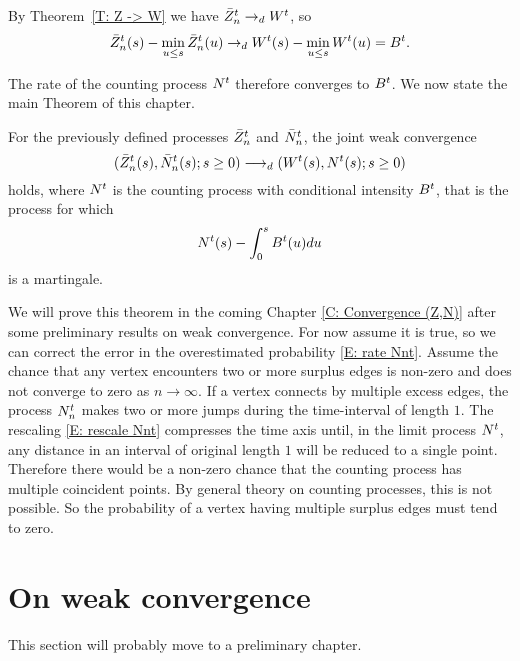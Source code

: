 By Theorem~\ref{T: Z -> W} we have $\bar{Z}^t_n \rightarrow_d W^t$,
so
\begin{equation}
\bar{Z}^t_n(s) - \min_{u \leq s}\bar{Z}^t_n(u) \rightarrow_d W^t(s) - \min_{u \leq s}W^t(u) = B^t.
\end{equation}

The rate of the counting process $N^t$ therefore converges to $B^t$.
We now state the main Theorem of this chapter.
\begin{theorem}
	For the previously defined processes $\bar{Z}^t_n$ and $\bar{N}_n^t$,
	the joint weak convergence
	\begin{equation}
	( \bar{Z}^t_n(s), \bar{N}_n^t(s); s \geq 0 ) \longrightarrow_d (W^t(s), N^t(s); s \geq 0)
	\end{equation}
	holds, where $N^t$ is the counting process with conditional intensity $B^t$,
	that is the process for which
	\begin{equation*}
	N^t(s) - \int_{0}^s B^t(u)du
	\end{equation*}
	is a martingale.
\end{theorem}

We will prove this theorem in the coming Chapter \ref{C: Convergence (Z,N)} after some preliminary results on weak convergence.
For now assume it is true, so we can correct the error in the overestimated probability \eqref{E: rate Nnt}.
Assume the chance that any vertex encounters two or more surplus edges is non-zero and does not converge to zero as $n \rightarrow \infty$.
If a vertex connects by multiple excess edges, the process $N_n^t$ makes two or more jumps during the time-interval of length $1$.
The rescaling \eqref{E: rescale Nnt} compresses the time axis until, in the limit process $N^t$, 
any distance in an interval of original length $1$ will be reduced to a single point.
Therefore there would be a non-zero chance that the counting process has multiple coincident points.
By general theory on counting processes, this is not possible.
So the probability of a vertex having multiple surplus edges must tend to zero.



\section{On weak convergence}
This section will probably move to a preliminary chapter.

